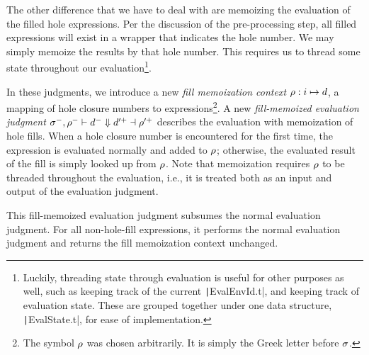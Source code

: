 
The other difference that we have to deal with are memoizing the evaluation of the filled hole expressions. Per the discussion of the pre-processing step, all filled expressions will exist in a wrapper that indicates the hole number. We may simply memoize the results by that hole number. This requires us to thread some state throughout our evaluation\footnote{Luckily, threading state through evaluation is useful for other purposes as well, such as keeping track of the current \texttt|EvalEnvId.t|, and keeping track of evaluation state. These are grouped together under one data structure, \texttt|EvalState.t|, for ease of implementation.}.

\begin{singlespace}
\end{singlespace}

In these judgments, we introduce a new \textit{fill memoization context} $\rho:i\mapsto d$, a mapping of hole closure numbers to expressions\footnote{The symbol $\rho$ was chosen arbitrarily. It is simply the Greek letter before $\sigma$.}. A new \textit{fill-memoized evaluation judgment} $\sigma^-,\rho^-\vdash d^-\Downarrow d'^+\dashv\rho'^+$ describes the evaluation with memoization of hole fills. When a hole closure number is encountered for the first time, the expression is evaluated normally and added to $\rho$; otherwise, the evaluated result of the fill is simply looked up from $\rho$. Note that memoization requires $\rho$ to be threaded throughout the evaluation, i.e., it is treated both as an input and output of the evaluation judgment.

This fill-memoized evaluation judgment subsumes the normal evaluation judgment. For all non-hole-fill expressions, it performs the normal evaluation judgment and returns the fill memoization context unchanged.

